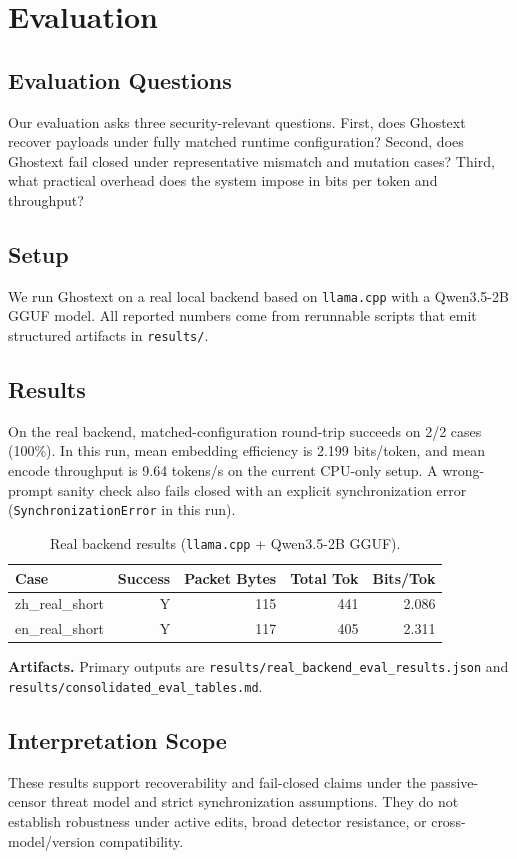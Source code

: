 \section{Evaluation}
\subsection{Evaluation Questions}
Our evaluation asks three security-relevant questions. First, does Ghostext recover payloads under fully matched runtime configuration? Second, does Ghostext fail closed under representative mismatch and mutation cases? Third, what practical overhead does the system impose in bits per token and throughput?

\subsection{Setup}
We run Ghostext on a real local backend based on \texttt{llama.cpp} with a Qwen3.5-2B GGUF model. All reported numbers come from rerunnable scripts that emit structured artifacts in \texttt{results/}.

\subsection{Results}
On the real backend, matched-configuration round-trip succeeds on 2/2 cases (100\%). In this run, mean embedding efficiency is 2.199 bits/token, and mean encode throughput is 9.64 tokens/s on the current CPU-only setup. A wrong-prompt sanity check also fails closed with an explicit synchronization error (\texttt{SynchronizationError} in this run).

\begin{table}[t]
\caption{Real backend results (\texttt{llama.cpp} + Qwen3.5-2B GGUF).}
\label{tab:real-backend}
\centering
\begin{tabular}{lrrrr}
\toprule
Case & Success & Packet Bytes & Total Tok & Bits/Tok \\
\midrule
zh\_real\_short & Y & 115 & 441 & 2.086 \\
en\_real\_short & Y & 117 & 405 & 2.311 \\
\bottomrule
\end{tabular}
\end{table}

\textbf{Artifacts.}
Primary outputs are \texttt{results/real\_backend\_eval\_results.json} and \texttt{results/consolidated\_eval\_tables.md}.

\subsection{Interpretation Scope}
These results support recoverability and fail-closed claims under the passive-censor threat model and strict synchronization assumptions. They do not establish robustness under active edits, broad detector resistance, or cross-model/version compatibility.
